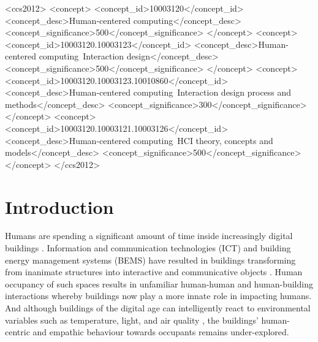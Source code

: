 \documentclass [sigconf] {acmart}
\begin{document}


\begin{CCSXML}
<ccs2012>
   <concept>
       <concept_id>10003120</concept_id>
       <concept_desc>Human-centered computing</concept_desc>
       <concept_significance>500</concept_significance>
       </concept>
   <concept>
       <concept_id>10003120.10003123</concept_id>
       <concept_desc>Human-centered computing~Interaction design</concept_desc>
       <concept_significance>500</concept_significance>
       </concept>
   <concept>
       <concept_id>10003120.10003123.10010860</concept_id>
       <concept_desc>Human-centered computing~Interaction design process and methods</concept_desc>
       <concept_significance>300</concept_significance>
       </concept>
   <concept>
       <concept_id>10003120.10003121.10003126</concept_id>
       <concept_desc>Human-centered computing~HCI theory, concepts and models</concept_desc>
       <concept_significance>500</concept_significance>
       </concept>
 </ccs2012>
\end{CCSXML}



 
\maketitle

\section{Introduction}

Humans are spending a significant amount of time inside increasingly digital buildings \cite{alavi2016future}. Information and communication technologies (ICT) and building energy management systems (BEMS) have resulted in buildings transforming from inanimate structures into interactive and communicative objects \cite{nembrini2017human}. Human occupancy of such spaces results in unfamiliar human-human and human-building interactions whereby buildings now play a more innate role in impacting humans. And although buildings of the digital age can intelligently react to environmental variables such as temperature, light, and air quality \cite{bluyssen2009indoor, moreno2014user}, the buildings' human-centric and empathic behaviour towards occupants remains under-explored. 
\end{document}

